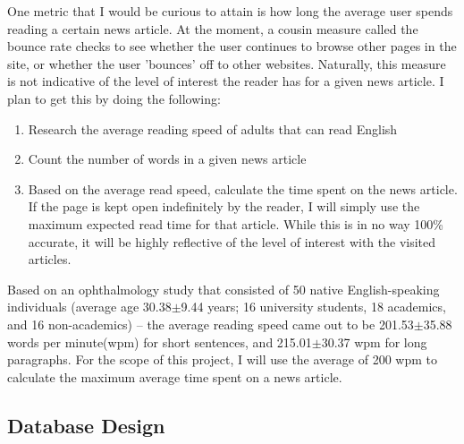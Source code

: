 \documentclass[12pt]{article}
\begin{document}
One metric that I would be curious to attain is how long the average user spends reading a certain news article. At the moment, a cousin measure called the bounce rate checks to see whether the user continues to browse other pages in the site, or whether the user 'bounces' off to other websites. Naturally, this measure is not indicative of the level of interest the reader has for a given news article. I plan to get this by doing the following:
\begin{enumerate}
\item Research the average reading speed of adults that can read English
\item Count the number of words in a given news article
\item Based on the average read speed, calculate the time spent on the news article. If the page is kept open indefinitely by the reader, I will simply use the maximum expected read time for that article. While this is in no way 100\% accurate, it will be highly reflective of the level of interest with the visited articles. 
\end{enumerate}     

\noindent Based on an ophthalmology study that consisted of 50 native English-speaking individuals (average age 30.38$\pm$9.44 years; 16 university students, 18 academics, and 16 non-academics) -- the average reading speed came out to be 201.53$\pm$35.88 words per minute(wpm) for short sentences, and 215.01$\pm$30.37 wpm for long paragraphs\cite{radner}. For the scope of this project, I will use the average of 200 wpm to calculate the maximum average time spent on a news article.  

\vfill

\subsection{Database Design}
\end{document}
